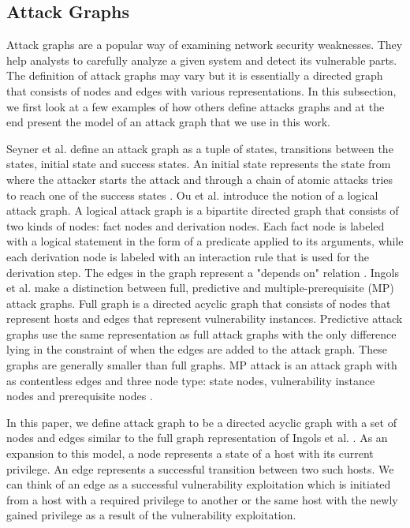 \subsection{Attack Graphs}
\label{chap:attack_graphs}

Attack graphs \cite{sheyner2002automated} are a popular way of examining network security weaknesses. They help analysts to carefully analyze a given system and detect its vulnerable parts. The definition of attack graphs may vary but it is essentially a directed graph that consists of nodes and edges with various representations. In this subsection, we first look at a few examples of how others define attacks graphs and at the end present the model of an attack graph that we use in this work.

Seyner et al. define an attack graph as a tuple of states, transitions between the states, initial state and success states. An initial state represents the state from where the attacker starts the attack and through a chain of atomic attacks tries to reach one of the success states \cite{sheyner2002automated}. Ou et al. introduce the notion of a logical attack graph. A logical attack graph is a bipartite directed graph that consists of two kinds of nodes: fact nodes and derivation nodes. Each fact node is labeled with a logical statement in the form of a predicate applied to its arguments, while each derivation node is labeled with an interaction rule that is used for the derivation step. The edges in the graph represent a "depends on" relation \cite{ou2006scalable}. Ingols et al. make a distinction between full, predictive and multiple-prerequisite (MP) attack graphs. Full graph is a directed acyclic graph that consists of nodes that represent hosts and edges that represent vulnerability instances. Predictive attack graphs use the same representation as full attack graphs with the only difference lying in the constraint of when the edges are added to the attack graph. These graphs are generally smaller than full graphs. MP attack is an attack graph with as contentless edges and three node type: state nodes, vulnerability instance nodes and prerequisite nodes \cite{ingols2006practical}.

In this paper, we define attack graph to be a directed acyclic graph with a set of nodes and edges similar to the full graph representation of Ingols et al. \cite{ingols2006practical}. As an expansion to this model, a node represents a state of a host with its current privilege. An edge represents a successful transition between two such hosts. We can think of an edge as a successful vulnerability exploitation which is initiated from a host with a required privilege to another or the same host with the newly gained privilege as a result of the vulnerability exploitation.